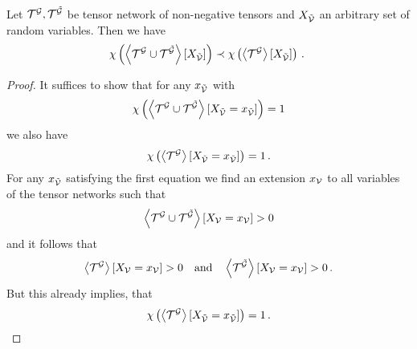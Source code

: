 \begin{theorem}\label{the:monotonicityBinaryContractions}
	Let $\mathcal{T}^{\mathcal{G}}, \mathcal{T}^{\tilde{\mathcal{G}}}$ be tensor network of non-negative tensors and $X_{\tilde{\mathcal{V}}}$ an arbitrary set of random variables. %
	Then we have
		\[ \nonzeroof{\contractionof{\extnet\cup\secextnet}{\catvariableof{\secnodes}}} \prec
		\nonzeroof{\contractionof{\extnet}{\catvariableof{\secnodes}}} \, .  \]
\end{theorem}
\begin{proof}
	It suffices to show that for any $x_{\tilde{\mathcal{V}}}$ with 
		\[ \chi\left(\left\langle \mathcal{T}^{\mathcal{G}}\cup\mathcal{T}^{\tilde{\mathcal{G}}}\right\rangle \left[ X_{\tilde{\mathcal{V}}}=x_{\tilde{\mathcal{V}}} \right]\right)=1 \]
	we also have 
		\[ \chi\left(\left\langle \mathcal{T}^{\mathcal{G}}\right\rangle \left[ X_{\tilde{\mathcal{V}}}=x_{\tilde{\mathcal{V}}} \right]\right)=1 \, . \]
	For any $x_{\tilde{\mathcal{V}}}$ satisfying the first equation we find an extension $x_{\mathcal{V}}$ to all variables of the tensor networks such that
		\[ \left\langle \mathcal{T}^{\mathcal{G}}\cup\mathcal{T}^{\tilde{\mathcal{G}}}\right\rangle \left[ X_{\mathcal{V}}=x_{\mathcal{V}} \right] > 0 \]
	and it follows that
		\[ \left\langle \mathcal{T}^{\mathcal{G}}\right\rangle \left[ X_{\mathcal{V}}=x_{\mathcal{V}} \right] > 0 \quad\text{and}\quad  \left\langle \mathcal{T}^{\tilde{\mathcal{G}}}\right\rangle \left[ X_{\mathcal{V}}=x_{\mathcal{V}} \right] > 0  \, . \]
	But this already implies, that 
		\[ \chi\left(\left\langle \mathcal{T}^{\mathcal{G}}\right\rangle \left[ X_{\tilde{\mathcal{V}}}=x_{\tilde{\mathcal{V}}} \right]\right)=1 \, . \]
\end{proof}

